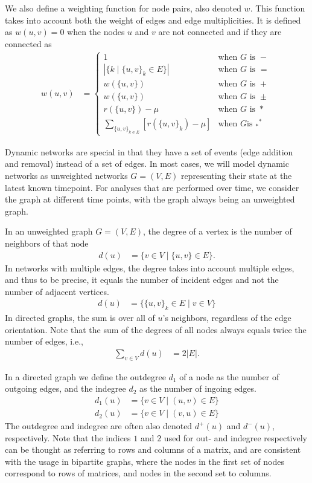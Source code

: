\documentclass{article}
\begin{document}
We also define a weighting function for node pairs, also denoted
$w$. This function takes into account both the weight of edges and edge
multiplicities. It is defined as $w(u,v)=0$ when the nodes $u$ and $v$ are
not connected and if they are connected as
\begin{align}
  w(u,v) &= \left\{ \begin{array}{ll}
    1 & \text{when $G$ is $-$} \\
    |\{k \mid \{u,v\}_k \in E\}| & \text{when $G$ is $=$} \\
    w(\{u,v\}) & \text{when $G$ is $+$}
    \\
    w(\{u,v\}) & \text{when $G$ is $\pm$} \\
    r(\{u,v\}) - \mu & \text{when $G$ is $*$} \\
    \sum_{\{u,v\}_{k\in E}} [r(\{u,v\}_k) - \mu] & \text{when $G$
      is $_*{}^*$}
    \end{array} \right. 
\end{align}

Dynamic networks are special in that they have a set of events (edge
addition and removal) instead of a set of edges.  In most cases, we will
model dynamic networks as unweighted networks $G=(V,E)$ representing
their state at the latest known timepoint.  For analyses that are
performed over time, we consider the graph at different time points,
with the graph always being an unweighted graph. 

In an unweighted graph $G=(V,E)$, the degree of a vertex is the number
of neighbors of that node
\begin{align}
  d(u) &= \{ v \in V \mid \{u,v\} \in E \}. 
\end{align}
In networks with multiple edges, the degree takes into account multiple
edges, and thus to be precise, it equals the number of incident edges
and not the number of adjacent vertices. 
\begin{align}
  d(u) &= \{ \{u,v\}_k \in E \mid v \in V \}
\end{align}
In directed graphs, the sum is over all of $u$'s neighbors, regardless
of the edge orientation. 
Note that the sum of the degrees of all nodes always equals twice the
number of edges, i.e.,
\begin{align}
  \sum_{v\in V} d(u) &= 2|E|. 
\end{align}

In a directed graph we define the outdegree $d_1$ of a node as the number of
outgoing edges, and the indegree $d_2$ as the number of ingoing edges.
\begin{align}
  d_1(u) &= \{ v \in V \mid (u,v) \in E \} \\
  d_2(u) &= \{ v \in V \mid (v,u) \in E \}
\end{align}
The outdegree and indegree are often also denoted $d^+(u)$ and
$d^-(u)$, respectively.  Note that the indices $1$ and $2$ used for out-
and indegree respectively can be thought as referring to rows and
columns of a matrix, and are consistent with the usage in bipartite
graphs, where the nodes in the first set of nodes correspond to rows of
matrices, and nodes in the second set to columns. 
\end{document}
